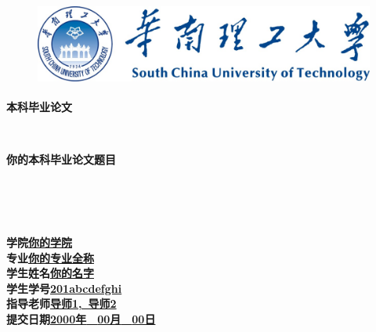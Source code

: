 \documentclass[a4paper]{article}
\begin{document}
\thispagestyle{empty}
\begin{figure}[ht]
\centering
\includegraphics[height=2.75cm]{title.png}
\end{figure}
\begin{center}
\textbf{本科毕业论文}
\end{center}
\nopagebreak[4]
\begin{center}
\ \\
\end{center}
\nopagebreak[4]
\begin{center}
\textbf{你的本科毕业论文题目}
\end{center}
\nopagebreak[4]
\begin{center}
\ \\\ \\\ \\
\end{center}
\nopagebreak[4]
\begin{spacing}{1.8}
\begin{center}
\textbf{学\quad\quad 院}\quad\underline{\quad\quad\textbf{你的学院}\quad\quad}\\
\textbf{专\quad\quad 业}\quad\underline{\quad\quad\quad\textbf{你的专业全称}\quad\quad\quad}\\
\textbf{学生姓名}\quad\underline{\quad\quad\quad\quad\textbf{你的名字}\quad\quad\quad\quad}\\
\textbf{学生学号}\quad\underline{\quad\quad\textbf{201abcdefghi}\quad\quad}\\
\textbf{指导老师}\quad\underline{\quad\quad\textbf{导师1,\ 导师2}\quad\quad}\\
\textbf{提交日期}\quad\underline{\quad\textbf{2000年}\ \ \textbf{00月}\ \ \textbf{00日}\quad}
\end{center}
\end{spacing}
\pagebreak[4]
\end{document}

